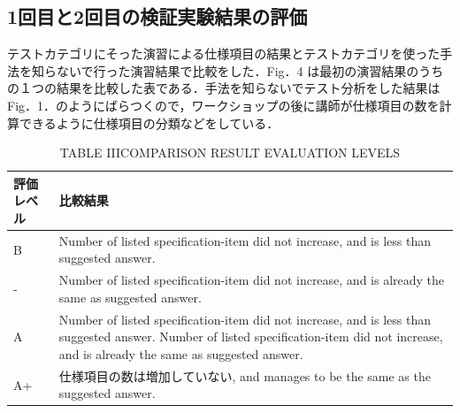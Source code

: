 \documentclass[a4paper,12pt]{jreport}
\begin{document}
\subsection{1回目と2回目の検証実験結果の評価}
テストカテゴリにそった演習による仕様項目の結果とテストカテゴリを使った手法を知らないで行った演習結果で比較をした．Fig．4 は最初の演習結果のうちの１つの結果を比較した表である．手法を知らないでテスト分析をした結果はFig．1．のようにばらつくので，ワークショップの後に講師が仕様項目の数を計算できるように仕様項目の分類などをしている．

\begin{table}[htbp]
  \centering
  \caption{TABLE IIICOMPARISON RESULT EVALUATION LEVELS}
    \begin{tabular}{|l|p{14.855em}|}
       \hline
    評価レベル & \multicolumn{1}{l|}{比較結果} \\
        \hline
     B    & Number of listed specification-item did not increase, and is less than suggested answer.  \\
        \hline
    -     & Number of listed specification-item did not increase, and is already the same as suggested answer.  \\
        \hline
    A     & Number of listed specification-item did not increase, and is less than suggested answer. Number of listed specification-item did not increase, and is already the same as suggested answer.  \\
       \hline
    A+    & 仕様項目の数は増加していない, and manages to be the same as the suggested answer.  \\
        \hline
    \end{tabular}%
  \label{tbl:D-3-tbl4}%
\end{table}%
\end{document}
